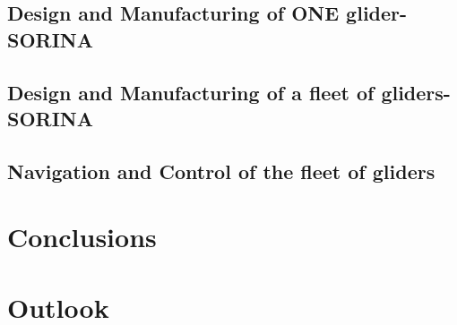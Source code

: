 \documentclass[]{iac}
\begin{document}
\subsection{Design and Manufacturing of ONE glider-SORINA}

\subsection{Design and Manufacturing of a fleet of gliders-SORINA}

\subsection{Navigation and Control of the fleet of gliders}
\label{subsection:navcontrol}



\section{Conclusions}
\section{Outlook}
\end{document}
